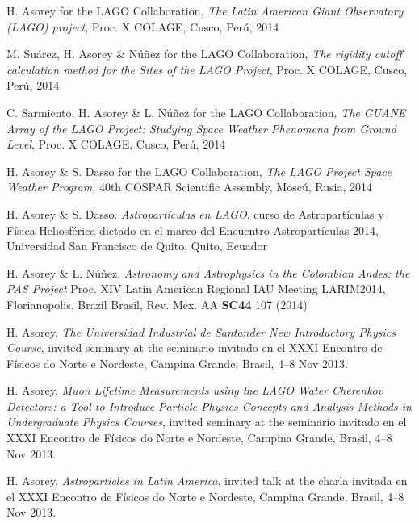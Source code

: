 \begin{etaremune}
\item {}H. Asorey for the LAGO Collaboration, {\emph{The Latin American Giant Observatory (LAGO) project}}, \en Proc. X COLAGE, Cusco, Perú, 2014

\item {}M. Suárez, H. Asorey \& Núñez for the LAGO Collaboration, {\emph{The rigidity cutoff calculation method for the Sites of the LAGO Project}}, \en Proc. X COLAGE, Cusco, Perú, 2014

\item {}C. Sarmiento, H. Asorey \& L. Núñez for the LAGO Collaboration, {\emph{The GUANE Array of the LAGO Project: Studying Space Weather Phenomena from Ground Level}}, \en Proc. X COLAGE, Cusco, Perú, 2014

\item {}H. Asorey \& S. Dasso for the LAGO Collaboration, {\emph{The LAGO Project Space Weather Program}}, \en 40th COSPAR Scientific Assembly, Moscú, Rusia, 2014

\item {}H. Asorey \& S. Dasso. {\emph{Astropartículas en LAGO}}, curso de Astropartículas y Física Heliosférica dictado en el marco del Encuentro Astropartículas 2014, Universidad San Francisco de Quito, Quito, Ecuador

\item {}H. Asorey \& L. Núñez, {\emph{Astronomy and Astrophysics in the Colombian Andes: the PAS Project}} \en Proc. XIV Latin American Regional IAU Meeting LARIM2014, Florianopolis, \ifeng Brazil \else Brasil\fi, Rev. Mex. AA {\bf{SC44}} 107 (2014)

\item {} H. Asorey, {\emph{The Universidad Industrial de Santander New Introductory Physics Course}}, 
\ifeng
invited seminary at the
\else
seminario invitado en el
\fi
XXXI Encontro de Físicos do Norte e Nordeste, Campina Grande, Brasil, 4--8 Nov 2013.

\item {} H. Asorey, {\emph{Muon Lifetime Measurements using the LAGO Water Cherenkov Detectors: a Tool to Introduce Particle Physics Concepts and Analysis Methods in Undergraduate Physics Courses}}, 
\ifeng
invited seminary at the
\else
seminario invitado en el
\fi
XXXI Encontro de Físicos do Norte e Nordeste, Campina Grande, Brasil, 4--8 Nov 2013.

\item {} H. Asorey, {\emph{Astroparticles in Latin America}}, 
\ifeng
invited talk at the
\else
charla invitada en el 
\fi
XXXI Encontro de Físicos do Norte e Nordeste, Campina Grande, Brasil, 4--8 Nov 2013.


\end{etaremune}
